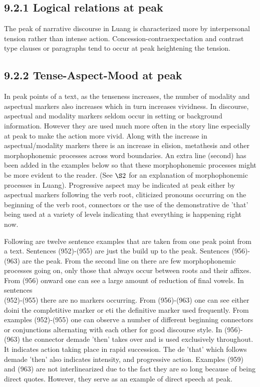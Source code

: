 \documentclass[10pt]{article}
\begin{document}
\subsection*{9.2.1 Logical relations at peak}
The peak of narrative discourse in Luang is characterized more by interpersonal tension rather than intense action. Concession-contraexpectation and contrast type clauses or paragraphs tend to occur at peak heightening the tension.

\subsection*{9.2.2 Tense-Aspect-Mood at peak}
In peak points of a text, as the tenseness increases, the number of modality and aspectual markers also increases which in turn increases vividness. In discourse, aspectual and modality markers seldom occur in setting or background information. However they are used much more often in the story line especially at peak to make the action more vivid. Along with the increase in aspectual/modality markers there is an increase in elision, metathesis and other morphophonemic processes across word boundaries. An extra line (second) has been added in the examples below so that these morphophonemic processes might be more evident to the reader. (See \(\S 2\) for an explanation of morphophonemic processes in Luang). Progressive aspect may be indicated at peak either by aspectual markers following the verb root, cliticized pronouns occurring on the beginning of the verb root, connectors or the use of the demonstrative de 'that' being used at a variety of levels indicating that everything is happening right now.

Following are twelve sentence examples that are taken from one peak point from a text. Sentences (952)-(955) are just the build up to the peak. Sentences (956)-(963) are the peak. From the second line on there are few morphophonemic processes going on, only those that always occur between roots and their affixes. From (956) onward one can see a large amount of reduction of final vowels. In sentences\\
(952)-(955) there are no markers occurring. From (956)-(963) one can see either doini the completitive marker or eti the definitive marker used frequently. From examples (952)-(955) one can observe a number of different beginning connectors or conjunctions alternating with each other for good discourse style. In (956)-(963) the connector demade 'then' takes over and is used exclusively throughout. It indicates action taking place in rapid succession. The de 'that' which follows demade 'then' also indicates intensity, and progressive action. Examples (959) and (963) are not interlinearized due to the fact they are so long because of being direct quotes. However, they serve as an example of direct speech at peak.
\end{document}
